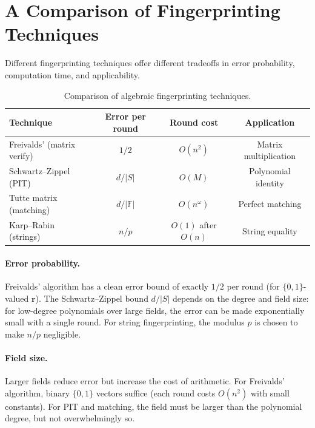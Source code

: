 \documentclass[twoside,12pt]{book}
\theoremstyle{plain}
\theoremstyle{definition}
\theoremstyle{remark}
\begin{document}
\section{A Comparison of Fingerprinting Techniques}
\label{sec:fingerprint-comparison}

Different fingerprinting techniques offer different tradeoffs in error probability, computation time, and applicability.

\begin{table}[H]
\centering
\caption{Comparison of algebraic fingerprinting techniques.}
\label{tab:fingerprint-comparison}
\begin{tabular}{@{}lccc@{}}
\toprule
\textbf{Technique} & \textbf{Error per round} & \textbf{Round cost} & \textbf{Application} \\
\midrule
Freivalds' (matrix verify) & $1/2$ & $O(n^2)$ & Matrix multiplication \\
Schwartz--Zippel (PIT) & $d/|S|$ & $O(M)$ & Polynomial identity \\
Tutte matrix (matching) & $d/|\mathbb{F}|$ & $O(n^\omega)$ & Perfect matching \\
Karp--Rabin (strings) & $n/p$ & $O(1)$ after $O(n)$ & String equality \\
\bottomrule
\end{tabular}
\end{table}

\paragraph{Error probability.}
Freivalds' algorithm has a clean error bound of exactly $1/2$ per round (for $\{0,1\}$-valued $\mathbf{r}$). The Schwartz--Zippel bound $d/|S|$ depends on the degree and field size: for low-degree polynomials over large fields, the error can be made exponentially small with a single round. For string fingerprinting, the modulus $p$ is chosen to make $n/p$ negligible.

\paragraph{Field size.}
Larger fields reduce error but increase the cost of arithmetic. For Freivalds' algorithm, binary $\{0,1\}$ vectors suffice (each round costs $O(n^2)$ with small constants). For PIT and matching, the field must be larger than the polynomial degree, but not overwhelmingly so.
\end{document}
